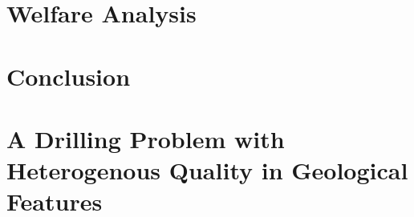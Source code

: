 \section{Welfare Analysis}
\label{Section:Welfare-Analysis}


\section{Conclusion}
\label{Section:Conclusion}

\clearpage


\appendix
\label{Appendix}
\clearpage





\section{A Drilling Problem with Heterogenous Quality in Geological Features}
\label{Section:Drilling-Problem-with-Heterogenous-Quality}

\clearpage









